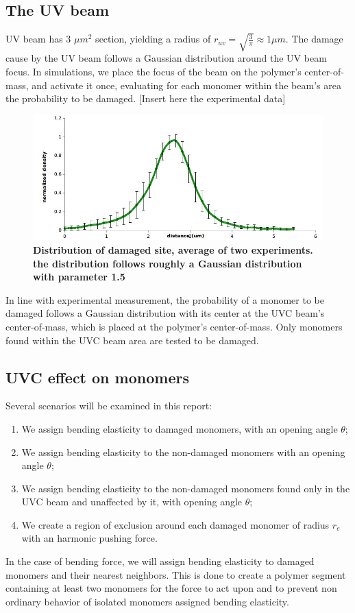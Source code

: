 \documentclass[12pt]{report}
\begin{document}
	\subsection{The UV beam}
	UV beam has 3 $\mu m^2$ section, yielding a radius of $r_{uv}=\sqrt{\frac{3}{\pi}}\approx 1 \mu m$. 
    The damage cause by the UV beam follows a Gaussian distribution around the UV beam focus. In simulations, we place the focus of the beam on the polymer's center-of-mass, and activate it once, evaluating for each monomer within the beam's area the probability to be damaged. [Insert here the experimental data]
    
	\begin{figure}[H]
	\centering
	\includegraphics[width=0.45\linewidth, height=0.2\textheight]{UVDamageDistribution}
	\caption{\tiny{\textbf{Distribution of damaged site, average of two experiments. the distribution follows roughly a Gaussian distribution with parameter 1.5}}}
	\label{fig:UVDamageDistribution}
	\end{figure}
	
    In line with experimental measurement, the probability of a monomer to be damaged follows a Gaussian distribution with its center at the UVC beam's center-of-mass, which is placed at the polymer's center-of-mass. Only monomers found within the UVC beam area are tested to be damaged. 
      	
    \subsection{UVC effect on monomers}
      Several scenarios will be examined in this report:
      \begin{enumerate}
      	\itemsep0em
      	\item We assign bending elasticity to damaged monomers, with an opening angle $\theta$;
      	\item We assign bending elasticity to the non-damaged monomers with an opening angle $\theta$;
      	\item We assign bending elasticity to the non-damaged monomers found only in the UVC beam and unaffected by it, with opening angle $\theta$;
      	\item We create a region of exclusion around each damaged monomer of radius $r_e$ with an harmonic pushing force.
      \end{enumerate}
      In the case of bending force, we will assign bending elasticity to damaged monomers and their nearest neighbors. This is done to create a polymer segment containing at least two monomers for the force to act upon and to prevent non ordinary behavior of isolated monomers assigned bending elasticity.      
	
\end{document}

